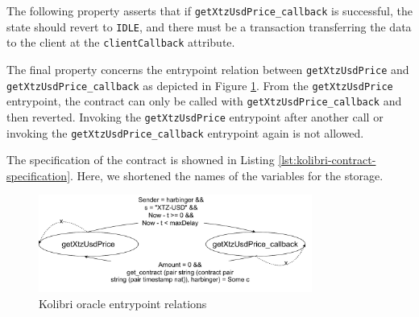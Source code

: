 \documentclass[a4paper,USenglish,cleveref, autoref,anonymous]{lipics-v2021}
\begin{document}
The following property asserts that if \lstinline/getXtzUsdPrice_callback/ is successful, the state should revert to \lstinline/IDLE/, and there must be a transaction transferring the data to the client at the \lstinline/clientCallback/ attribute. 

The final property concerns the entrypoint relation between
\lstinline/getXtzUsdPrice/ and \lstinline/getXtzUsdPrice_callback/ as
depicted in Figure \ref{fig:kolibri-oracle-emtrypoint-relations}. From
the \lstinline/getXtzUsdPrice/ entrypoint, the contract can only be
called with \lstinline/getXtzUsdPrice_callback/ and then
reverted. Invoking the \lstinline/getXtzUsdPrice/ entrypoint after
another call or invoking the \lstinline/getXtzUsdPrice_callback/
entrypoint again is not allowed. 

The specification of  the contract is showned in Listing \ref{lst:kolibri-contract-specification}. Here, we shortened the names of the variables for the storage.
\begin{figure}[tp]
    \centering
    \includegraphics[width=0.8\textwidth]{kolibri}
    \caption{Kolibri oracle entrypoint relations}
    \label{fig:kolibri-oracle-emtrypoint-relations}
\end{figure}
\end{document}
